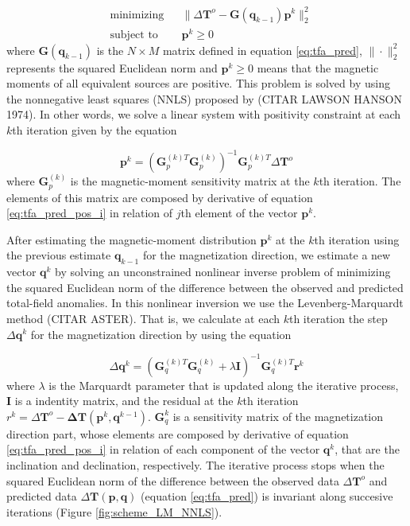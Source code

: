 \begin{equation}
	\begin{aligned}
		& \text{minimizing}
		& &\lVert \Delta \mathbf{T}^o - \mathbf{G}(\mathbf{q}_{k-1}) \mathbf{p}^k \rVert_{2}^{2} \\
		& \text{subject to}
		& & \mathbf{p}^k \geqslant 0
	\end{aligned}
	\label{eq:positivity}
\end{equation}
where $\mathbf{G}(\mathbf{q}_{k-1})$ is the $N \times M$ matrix defined in equation \ref{eq:tfa_pred},
$\| \cdot \|_{2}^{2}$ represents the squared Euclidean norm and $\mathbf{p}^k \geqslant 0$ means that the magnetic moments of all equivalent sources are positive. This problem is solved by using the nonnegative least squares (NNLS) proposed by (CITAR LAWSON HANSON 1974). In other words, we solve a linear system with positivity constraint at each $k$th iteration given by the equation 

\begin{equation}
	\mathbf{p}^k = \left(\mathbf{G}_{p}^{(k)T} \mathbf{G}_{p}^{(k)}\right)^{-1} \mathbf{G}_{p}^{(k)T}  \Delta \mathbf{T}^o
	\label{eq:linsys_p}
\end{equation}
where $\mathbf{G}_p^{(k)}$ is the magnetic-moment sensitivity matrix at the $k$th iteration. The elements of this matrix are composed by derivative of equation \ref{eq:tfa_pred_pos_i} in relation of $j$th element of the vector $\mathbf{p}^k$.

After estimating the magnetic-moment distribution $\mathbf{p}^k$ at the $k$th iteration using the previous estimate $\mathbf{q}_{k-1}$ for the magnetization direction, we estimate a new vector $\mathbf{q}^{k}$ by solving an unconstrained nonlinear inverse problem of minimizing the squared Euclidean norm of the difference between the observed and predicted total-field anomalies. In this nonlinear inversion we use the Levenberg-Marquardt method (CITAR ASTER). That is, we calculate at each $k$th iteration the step $\Delta \mathbf{q}^k$ for the magnetization direction by using the equation

\begin{equation}
	\Delta \mathbf{q}^k = (\mathbf{G}_{q}^{(k)T} \mathbf{G}_{q}^{(k)} + \lambda \mathbf{I})^{-1} \mathbf{G}_{q}^{(k)T}  \mathbf{r}^k
	\label{eq:linsys_q}
\end{equation}
where $\lambda$ is the Marquardt parameter that is updated along the iterative process, $\mathbf{I}$ is a indentity matrix, and  the residual at the $k$th iteration $r^k = \Delta \mathbf{T}^o - \mathbf{\Delta T} (\mathbf{p}^k, \mathbf{q}^{k-1})$. $\mathbf{G}_q^k$ is a sensitivity matrix of the magnetization direction part, whose elements are composed by derivative of equation \ref{eq:tfa_pred_pos_i} in relation of each component of the vector $\mathbf{q}^k$, that are the inclination and declination, respectively. The iterative process stops when the squared Euclidean norm of the difference between the observed data $\Delta \mathbf{T}^{o}$ and predicted data $\Delta\mathbf{T}(\mathbf{p}, \mathbf{q})$ (equation \ref{eq:tfa_pred}) is invariant along succesive iterations (Figure \ref{fig:scheme_LM_NNLS}).

